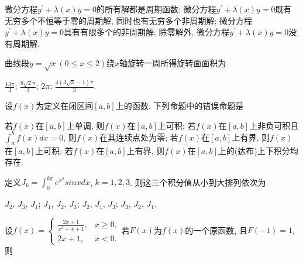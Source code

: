 \documentclass{exam}
\begin{document}
\begin{questions}
    \begin{choices}
        \choice 微分方程$y^{'}+\lambda(x)y=0$的所有解都是周期函数;
        \choice 微分方程$y^{'}+\lambda(x)y=0$既有无穷多个不恒等于零的周期解, 同时也有无穷多个非周期解;
        \choice 微分方程$y^{'}+\lambda(x)y=0$具有有限多个的非周期解;
        \choice 除零解外, 微分方程$y^{'}+\lambda(x)y=0$没有周期解.
    \end{choices}
    \question[3]曲线段$y=\sqrt{x}(0\leq x\leq 2)$绕$x$轴旋转一周所得旋转面面积为
    \begin{choices}
        \choice $\frac{13\pi}{3}$;
        \choice $\frac{8\sqrt{2}\pi}{3}$;
        \choice $2\pi$;
        \choice $\frac{4(3\sqrt{3}-1)\pi}{3}$.
    \end{choices}
    \question[3]设$f(x)$为定义在闭区间$[a,b]$上的函数. 下列命题中的错误命题是
    \begin{choices}
        \choice 若$f(x)$在$[a,b]$上单调, 则$f(x)$在$[a,b]$上可积;
        \choice 若$f(x)$在$[a,b]$上非负可积且$\int_{a}^{b}f(x)dx=0$, 则$f(x)$在其连续点处为零;
        \choice 若$f(x)$在$[a,b]$上有界, 则$f(x)$在$[a,b]$上可积;
        \choice 若$f(x)$在$[a,b]$上有界, 则$f(x)$在$[a,b]$上的(达布)上下积分均存在.
    \end{choices}
    \question[3]定义$J_k=\int_{0}^{k\pi}e^{x^2}sinxdx$, $k=1,2,3$. 则这三个积分值从小到大排列依次为
    \begin{choices}
        \choice $J_2$, $J_3$, $J_1$;
        \choice $J_1$, $J_2$, $J_3$;
        \choice $J_2$, $J_1$, $J_3$;
        \choice $J_3$, $J_2$, $J_1$.
    \end{choices}
    \question[3]设$f(x)=
    \begin{cases}
        \frac{2x+1}{x^2+x+1},& x \geq 0,\\
        2x+1,& x < 0.
    \end{cases}$若$F(x)$为$f(x)$的一个原函数, 且$F(-1)=1$, 则
\end{questions}
\end{document}
